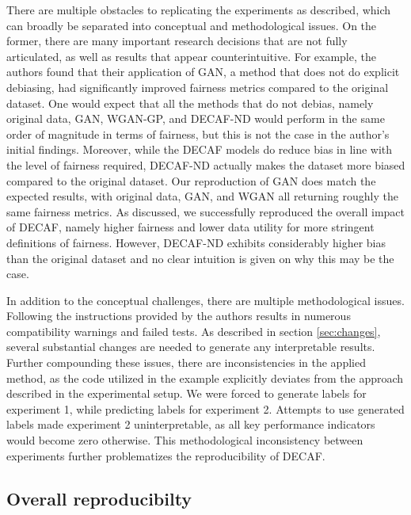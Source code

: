 There are multiple obstacles to replicating the experiments as described, which can broadly be separated into conceptual and methodological issues. On the former, there are many important research decisions that are not fully articulated, as well as results that appear counterintuitive. For example, the authors found that their application of GAN, a method that does not do explicit debiasing, had significantly improved fairness metrics compared to the original dataset. One would expect that all the methods that do not debias, namely original data, GAN, WGAN-GP, and DECAF-ND would perform in the same order of magnitude in terms of fairness, but this is not the case in the author's initial findings. Moreover, while the DECAF models do reduce bias in line with the level of fairness required, DECAF-ND actually makes the dataset more biased compared to the original dataset. Our reproduction of GAN does match the expected results, with original data, GAN, and WGAN all returning roughly the same fairness metrics. As discussed, we successfully reproduced the overall impact of DECAF, namely higher fairness and lower data utility for more stringent definitions of fairness. However, DECAF-ND exhibits considerably higher bias than the original dataset and no clear intuition is given on why this may be the case. 

In addition to the conceptual challenges, there are multiple methodological issues. Following the instructions provided by the authors results in numerous compatibility warnings and failed tests. As described in section \ref{sec:changes}, several substantial changes are needed to generate any interpretable results. Further compounding these issues, there are inconsistencies in the applied method, as the code utilized in the example explicitly deviates from the approach described in the experimental setup. We were forced to generate labels for experiment 1, while predicting labels for experiment 2. Attempts to use generated labels made experiment 2 uninterpretable, as all key performance indicators would become zero otherwise. This methodological inconsistency between experiments further problematizes the reproducibility of DECAF.

\subsection{Overall reproducibilty}

